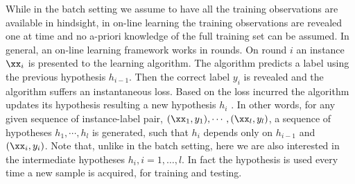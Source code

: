


While in the batch setting we assume to have all the training observations are
available in hindsight, in on-line learning the training observations are
revealed one at time and no a-priori knowledge of the full training
set can be assumed. In general, an on-line learning framework works in rounds.
On round $i$ an instance $\xx_i$ is presented to the learning algorithm. 
The algorithm predicts a label using the previous hypothesis $h_{i-1}$. 
Then the correct label $y_i$ is revealed and the algorithm suffers an instantaneous
loss. Based on the loss incurred the algorithm updates its hypothesis
resulting a new hypothesis $h_i$ \cite{Herbrich01}.  
In other words, for any given sequence of
instance-label pair, $(\xx_1,y_1),\cdots,(\xx_l,y_l)$, a sequence of
hypotheses $h_1,\cdots,h_{l}$ is generated, such that $h_{i}$ depends
only on $h_{i-1}$ and $(\xx_i,y_i)$.
Note that, unlike in the batch setting, here we are also interested
in the intermediate hypotheses $h_i, i=1,\ldots,l$. In fact the
hypothesis is used every time a new sample is acquired, for training and
testing.

